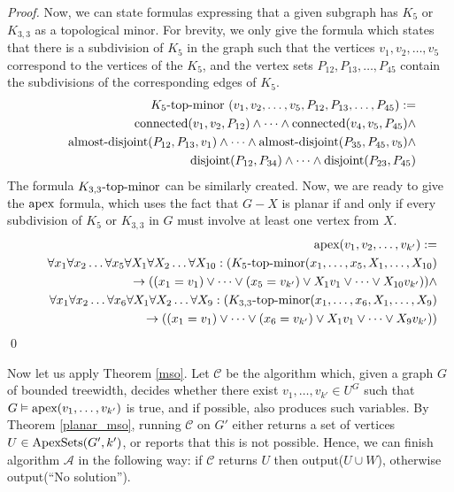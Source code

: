 \documentclass{llncs}
\begin{document}
\begin{proof}
Now, we can state formulas expressing that a given subgraph has $K_5$ or $K_{3,3}$ as a topological minor.
For brevity, we only give the formula which states that there is a subdivision of $K_5$ in the graph
such that the vertices $v_1, v_2, \dots, v_5$ correspond to the vertices of the $K_5$, and the
vertex sets $P_{12}, P_{13}, \dots, P_{45}$ contain the subdivisions of the corresponding edges of $K_5$.
\begin{eqnarray*}
& &
\textup{$K_5$-top-minor }(v_1,v_2, \dots, v_5, P_{12},P_{13},\dots, P_{45}) :=  \\
& &
\quad \textup{connected}(v_1,v_2,P_{12}) \land \dots \land \textup{connected}(v_4,v_5,P_{45}) \land \\
& &
\quad \textup{almost-disjoint}(P_{12},P_{13},v_1) \land \dots \land \textup{almost-disjoint}(P_{35},P_{45},v_5) \land \\
& &
\quad \textup{disjoint}(P_{12},P_{34}) \land \dots \land \textup{disjoint}(P_{23},P_{45})
\end{eqnarray*}
The formula $\textup{$K_{3,3}$-top-minor}$ can be similarly created. Now, we are ready to give the $\textup{apex}$ formula,
which uses the fact that $G-X$ is planar if and only if every subdivision of $K_5$ or $K_{3,3}$ in $G$ must involve at least one vertex from $X$.
\begin{eqnarray*}
& &
\textup{apex}(v_1,v_2, \dots, v_{k'}) :=  \\
& &
\quad \forall x_1 \forall x_2 \dots \forall x_5 \forall X_1 \forall X_2 \dots \forall X_{10}:
(\textup{$K_5$-top-minor}(x_1, \dots, x_5,X_1, \dots, X_{10}) \\
& &
\quad \quad \rightarrow ((x_1=v_1) \lor \dots \lor (x_5=v_{k'})  \lor X_1 v_1 \lor \dots \lor X_{10} v_{k'})) \land \\
& &
\quad \forall x_1 \forall x_2 \dots \forall x_6 \forall X_1 \forall X_2 \dots \forall X_9:
(\textup{$K_{3,3}$-top-minor}(x_1,\dots, x_6,X_1, \dots, X_9) \\
& &
\quad \quad \rightarrow((x_1=v_1) \lor \dots \lor (x_6=v_{k'})  \lor X_1 v_1 \lor \dots \lor X_{9} v_{k'})) \\
\end{eqnarray*}
\qed
\end{proof}

Now let us apply Theorem \ref{mso}.
Let $\mathcal{C}$ be the algorithm which, given a graph $G$ of bounded treewidth,
decides whether there exist $v_1, \dots, v_{k'} \in U^G$ such that
$G \vDash \textup{apex}(v_1, \dots, v_{k'})$ is true, and if possible, also produces such variables.
By Theorem \ref{planar_mso}, running $\mathcal{C}$ on $G'$ either returns a set of vertices
$U \in \textup{ApexSets}(G', k')$, or reports that this is not possible.
Hence, we can finish algorithm $\mathcal{A}$ in the following way:
if $\mathcal{C}$ returns $U$ then output($U \cup W$), otherwise
output(``No solution'').
\end{document}
